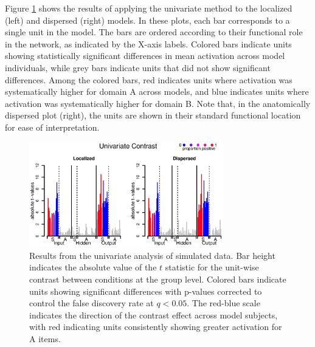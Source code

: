 Figure \ref{fig.univariate} shows the results of applying the univariate method to the localized (left) and dispersed (right) models. In these plots, each bar corresponds to a single unit in the model. The bars are ordered according to their functional role in the network, as indicated by the X-axis labels. Colored bars indicate units showing statistically significant differences in mean activation across model individuals, while grey bars indicate units that did not show significant differences. Among the colored bars, red indicates units where activation was systematically higher for domain A across models, and blue indicates units where activation was systematically higher for domain B. Note that, in the anatomically dispersed plot (right), the units are shown in their standard functional location for ease of interpretation.


\begin{figure}
\centering
\includegraphics[width=0.75\textwidth]{figures/figure4.eps}
\caption{Results from the univariate analysis of simulated data. Bar height indicates the absolute value of the $t$ statistic for the unit-wise contrast between conditions at the group level. Colored bars indicate units showing significant differences with p-values corrected to control the false discovery rate at $q<0.05$. The red-blue scale indicates the direction of the contrast effect across model subjects, with red indicating units consistently showing greater activation for A items.}
\label{fig.univariate} 
\end{figure}

